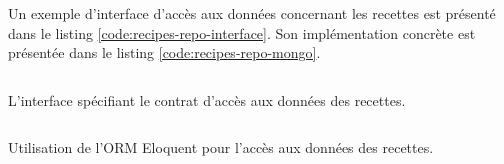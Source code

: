 		Un exemple d'interface d'accès aux données concernant les recettes est présenté dans le listing \ref{code:recipes-repo-interface}. Son implémentation concrète est présentée dans le listing \ref{code:recipes-repo-mongo}.

		\begin{listing}[H]
			\inputminted{php}{code/RecipesRepository.php}
			\caption{L'interface spécifiant le contrat d'accès aux données des recettes.}
			\label{code:recipes-repo-interface}
		\end{listing}

		\begin{code}
			\inputminted{php}{code/MongoRecipesRepository.php}
			\caption{Utilisation de l'ORM Eloquent pour l'accès aux données des recettes.}
			\label{code:recipes-repo-mongo}
		\end{code}
